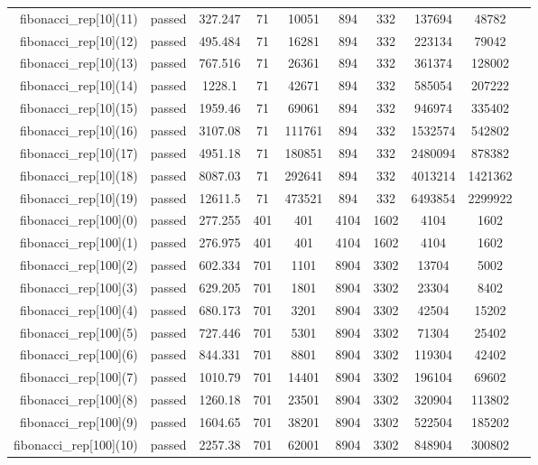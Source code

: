 \begin{longtable}{r|ccccccccc}
    fibonacci\_rep[10](11) & passed & 327.247 & 71 & 10051 & 894 & 332 & 137694 & 48782 \\
    fibonacci\_rep[10](12) & passed & 495.484 & 71 & 16281 & 894 & 332 & 223134 & 79042 \\
    fibonacci\_rep[10](13) & passed & 767.516 & 71 & 26361 & 894 & 332 & 361374 & 128002 \\
    fibonacci\_rep[10](14) & passed & 1228.1 & 71 & 42671 & 894 & 332 & 585054 & 207222 \\
    fibonacci\_rep[10](15) & passed & 1959.46 & 71 & 69061 & 894 & 332 & 946974 & 335402 \\
    fibonacci\_rep[10](16) & passed & 3107.08 & 71 & 111761 & 894 & 332 & 1532574 & 542802 \\
    fibonacci\_rep[10](17) & passed & 4951.18 & 71 & 180851 & 894 & 332 & 2480094 & 878382 \\
    fibonacci\_rep[10](18) & passed & 8087.03 & 71 & 292641 & 894 & 332 & 4013214 & 1421362 \\
    fibonacci\_rep[10](19) & passed & 12611.5 & 71 & 473521 & 894 & 332 & 6493854 & 2299922 \\
    fibonacci\_rep[100](0) & passed & 277.255 & 401 & 401 & 4104 & 1602 & 4104 & 1602 \\
    fibonacci\_rep[100](1) & passed & 276.975 & 401 & 401 & 4104 & 1602 & 4104 & 1602 \\
    fibonacci\_rep[100](2) & passed & 602.334 & 701 & 1101 & 8904 & 3302 & 13704 & 5002 \\
    fibonacci\_rep[100](3) & passed & 629.205 & 701 & 1801 & 8904 & 3302 & 23304 & 8402 \\
    fibonacci\_rep[100](4) & passed & 680.173 & 701 & 3201 & 8904 & 3302 & 42504 & 15202 \\
    fibonacci\_rep[100](5) & passed & 727.446 & 701 & 5301 & 8904 & 3302 & 71304 & 25402 \\
    fibonacci\_rep[100](6) & passed & 844.331 & 701 & 8801 & 8904 & 3302 & 119304 & 42402 \\
    fibonacci\_rep[100](7) & passed & 1010.79 & 701 & 14401 & 8904 & 3302 & 196104 & 69602 \\
    fibonacci\_rep[100](8) & passed & 1260.18 & 701 & 23501 & 8904 & 3302 & 320904 & 113802 \\
    fibonacci\_rep[100](9) & passed & 1604.65 & 701 & 38201 & 8904 & 3302 & 522504 & 185202 \\
    fibonacci\_rep[100](10) & passed & 2257.38 & 701 & 62001 & 8904 & 3302 & 848904 & 300802 \\

\end{longtable}

